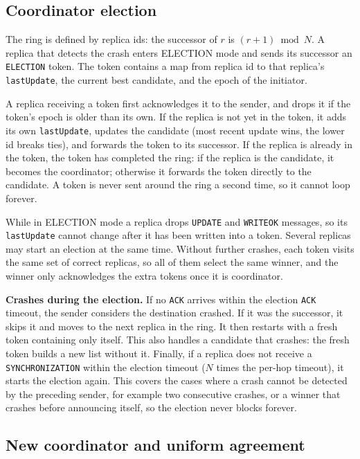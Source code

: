 \subsection{Coordinator election}

The ring is defined by replica ids: the successor of $r$ is $(r+1) \bmod N$. A replica that detects the crash enters ELECTION mode and sends its successor an \texttt{ELECTION} token. The token contains a map from replica id to that replica's \texttt{lastUpdate}, the current best candidate, and the epoch of the initiator.

A replica receiving a token first acknowledges it to the sender, and drops it if the token's epoch is older than its own. If the replica is not yet in the token, it adds its own \texttt{lastUpdate}, updates the candidate (most recent update wins, the lower id breaks ties), and forwards the token to its successor. If the replica is already in the token, the token has completed the ring: if the replica is the candidate, it becomes the coordinator; otherwise it forwards the token directly to the candidate. A token is never sent around the ring a second time, so it cannot loop forever.

While in ELECTION mode a replica drops \texttt{UPDATE} and \texttt{WRITEOK} messages, so its \texttt{lastUpdate} cannot change after it has been written into a token. Several replicas may start an election at the same time. Without further crashes, each token visits the same set of correct replicas, so all of them select the same winner, and the winner only acknowledges the extra tokens once it is coordinator.

\textbf{Crashes during the election.} If no \texttt{ACK} arrives within the election \texttt{ACK} timeout, the sender considers the destination crashed. If it was the successor, it skips it and moves to the next replica in the ring. It then restarts with a fresh token containing only itself. This also handles a candidate that crashes: the fresh token builds a new list without it. Finally, if a replica does not receive a \texttt{SYNCHRONIZATION} within the election timeout ($N$ times the per-hop timeout), it starts the election again. This covers the cases where a crash cannot be detected by the preceding sender, for example two consecutive crashes, or a winner that crashes before announcing itself, so the election never blocks forever.

\subsection{New coordinator and uniform agreement}

